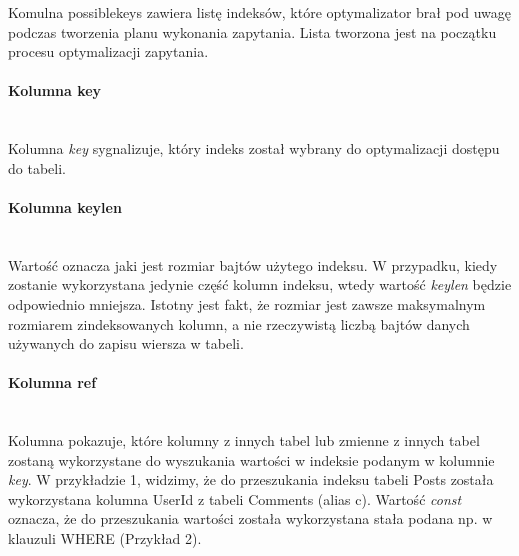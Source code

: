 Komulna possible\textunderscore keys zawiera listę indeksów, które optymalizator brał pod uwagę podczas tworzenia planu wykonania zapytania. Lista tworzona jest na początku procesu optymalizacji zapytania.

\paragraph{Kolumna key}\leavevmode\\

Kolumna \textit{key} sygnalizuje, który indeks został wybrany do optymalizacji dostępu do tabeli.

\paragraph{Kolumna key\textunderscore len}\leavevmode\\
Wartość oznacza jaki jest rozmiar bajtów użytego indeksu. W przypadku, kiedy zostanie wykorzystana jedynie część kolumn indeksu, wtedy wartość \textit{key\textunderscore len} będzie odpowiednio mniejsza. Istotny jest fakt, że rozmiar jest zawsze maksymalnym rozmiarem zindeksowanych kolumn, a nie rzeczywistą liczbą bajtów danych używanych do zapisu wiersza w tabeli.

\paragraph{Kolumna ref}\leavevmode\\
Kolumna pokazuje, które kolumny z innych tabel lub zmienne z innych tabel zostaną wykorzystane do wyszukania wartości w indeksie podanym w kolumnie \textit{key}. W przykładzie 1, widzimy, że do przeszukania indeksu tabeli Posts została wykorzystana kolumna UserId z tabeli Comments (alias c). Wartość \textit{const} oznacza, że do przeszukania wartości została wykorzystana stała podana np. w klauzuli WHERE (Przykład 2).

